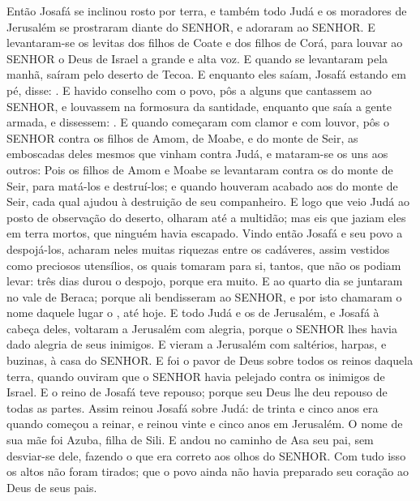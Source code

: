 {  Então Josafá se inclinou rosto por terra, e também todo Judá e os moradores de Jerusalém se prostraram diante do SENHOR, e adoraram ao SENHOR.
  E levantaram-se os levitas dos filhos de Coate e dos filhos de Corá, para louvar ao SENHOR o Deus de Israel a grande e alta voz.
  E quando se levantaram pela manhã, saíram pelo deserto de Tecoa. E enquanto eles saíam, Josafá estando em pé, disse: .
  E havido conselho com o povo, pôs a alguns que cantassem ao SENHOR, e louvassem na formosura da santidade, enquanto que saía a gente armada, e dissessem: .
  E quando começaram com clamor e com louvor, pôs o SENHOR contra os filhos de Amom, de Moabe, e do monte de Seir, as emboscadas deles mesmos que vinham contra Judá, e mataram-se os uns aos outros:
  Pois os filhos de Amom e Moabe se levantaram contra os do monte de Seir, para matá-los e destruí-los; e quando houveram acabado aos do monte de Seir, cada qual ajudou à destruição de seu companheiro.
  E logo que veio Judá ao posto de observação do deserto, olharam até a multidão; mas eis que jaziam eles em terra mortos, que ninguém havia escapado.
  Vindo então Josafá e seu povo a despojá-los, acharam neles muitas riquezas entre os cadáveres, assim vestidos como preciosos utensílios, os quais tomaram para si, tantos, que não os podiam levar: três dias durou o despojo, porque era muito.
  E ao quarto dia se juntaram no vale de Beraca; porque ali bendisseram ao SENHOR, e por isto chamaram o nome daquele lugar o , até hoje.
  E todo Judá e os de Jerusalém, e Josafá à cabeça deles, voltaram a Jerusalém com alegria, porque o SENHOR lhes havia dado alegria de seus inimigos.
  E vieram a Jerusalém com saltérios, harpas, e buzinas, à casa do SENHOR.
  E foi o pavor de Deus sobre todos os reinos daquela terra, quando ouviram que o SENHOR havia pelejado contra os inimigos de Israel.
  E o reino de Josafá teve repouso; porque seu Deus lhe deu repouso de todas as partes. %
  Assim reinou Josafá sobre Judá: de trinta e cinco anos era quando começou a reinar, e reinou vinte e cinco anos em Jerusalém. O nome de sua mãe foi Azuba, filha de Sili.
  E andou no caminho de Asa seu pai, sem desviar-se dele, fazendo o que era correto aos olhos do SENHOR.
  Com tudo isso os altos não foram tirados; que o povo ainda não havia preparado seu coração ao Deus de seus pais.
}
